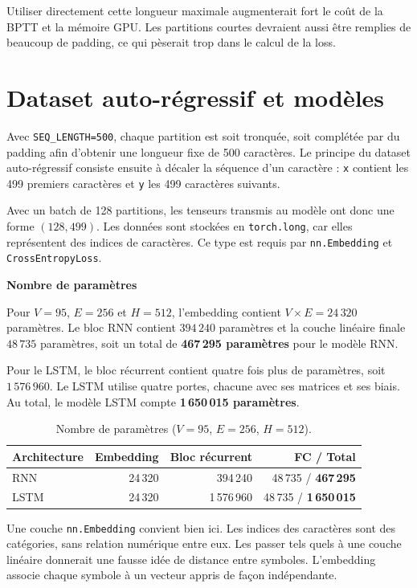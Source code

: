 \documentclass[11pt,a4paper]{article}
\begin{document}
Utiliser directement cette longueur maximale augmenterait fort
le coût de la BPTT et la mémoire GPU. Les partitions courtes
devraient aussi être remplies de beaucoup de padding, ce qui
pèserait trop dans le calcul de la loss.

\section{Dataset auto-régressif et modèles}

Avec \texttt{SEQ\_LENGTH=500}, chaque partition est soit tronquée,
soit complétée par du padding afin d'obtenir une longueur fixe de
500 caractères. Le principe du dataset auto-régressif consiste ensuite
à décaler la séquence d'un caractère : \texttt{x} contient les
499 premiers caractères et \texttt{y} les 499 caractères suivants.

Avec un batch de 128 partitions, les tenseurs transmis au modèle ont
donc une forme $(128,499)$. Les données sont stockées en
\texttt{torch.long}, car elles représentent des indices de caractères.
Ce type est requis par \texttt{nn.Embedding} et
\texttt{CrossEntropyLoss}.

\textbf{Nombre de paramètres}

Pour $V=95$, $E=256$ et $H=512$, l'embedding contient
$V\times E=24\,320$ paramètres. Le bloc RNN contient $394\,240$
paramètres et la couche linéaire finale $48\,735$ paramètres, soit un
total de \textbf{467\,295 paramètres} pour le modèle RNN.

Pour le LSTM, le bloc récurrent contient quatre fois plus de
paramètres, soit $1\,576\,960$. Le LSTM utilise quatre portes,
chacune avec ses matrices et ses biais. Au total, le modèle LSTM
compte \textbf{1\,650\,015 paramètres}.

\begin{table}[H]
\centering
\small
\caption{Nombre de paramètres ($V=95$, $E=256$, $H=512$).}
\begin{tabular}{@{}lrrr@{}}
\toprule
Architecture & Embedding & Bloc récurrent & FC / Total \\
\midrule
RNN & 24\,320 & 394\,240 & 48\,735 / \textbf{467\,295} \\
LSTM & 24\,320 & 1\,576\,960 & 48\,735 / \textbf{1\,650\,015} \\
\bottomrule
\end{tabular}
\end{table}

Une couche \texttt{nn.Embedding} convient bien ici. Les indices des
caractères sont des catégories, sans relation numérique entre eux.
Les passer tels quels à une couche linéaire donnerait une fausse idée
de distance entre symboles. L'embedding associe chaque symbole à un
vecteur appris de façon indépendante.
\end{document}
